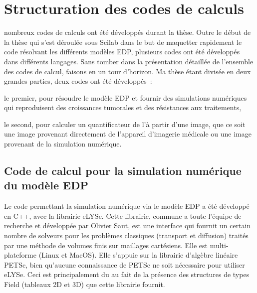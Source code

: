 \documentclass[main.tex]{subfiles}
\begin{document}
\chapter{Structuration des codes de calculs \label{chap:structure_code} }
 nombreux codes de calculs ont été développés durant la thèse. Outre le début de la thèse qui s'est déroulée sous Scilab dans le but de maquetter rapidement le code résolvant les différents modèles EDP, plusieurs codes ont été développés dans différents langages. 
Sans tomber dans la présentation détaillée de l'ensemble des codes de calcul,  %
faisons en un tour d'horizon. Ma thèse étant divisée en deux grandes parties, deux codes ont été développés~:
\begin{myitemize}
\item le premier, pour résoudre le modèle EDP et fournir des simulations numériques qui reproduisent des croissances tumorales et des résistances aux traitements,
\item le second, pour calculer un quantificateur de l'\hetero à partir d'une image, que ce soit une image provenant directement de l'appareil d'imagerie médicale ou une image provenant de la simulation numérique.
\end{myitemize}  

\section{Code de calcul pour la simulation numérique du modèle EDP}
Le code permettant la simulation numérique via le modèle EDP a été développé en C++, avec la librairie eLYSe. Cette librairie, commune a toute l'équipe de recherche et développée par Olivier Saut, est une interface qui fournit un certain nombre de solveurs pour les problèmes classiques (transport et diffusion) traités par une méthode de volumes finis sur maillages cartésiens. Elle est multi-plateforme (Linux et MacOS). 
Elle s'appuie sur la librairie d'algèbre linéaire PETSc, bien qu'aucune connaissance de PETSc ne soit nécessaire pour utiliser eLYSe. 
Ceci est principalement du au fait de la présence des structures de types Field (tableaux 2D et 3D) que cette librairie fournit. 
\end{document}
